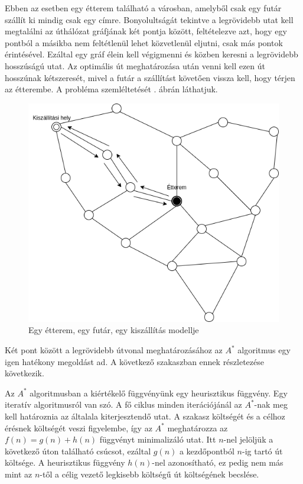

Ebben az esetben egy étterem található a városban, amelyből csak egy futár szállít ki mindig csak egy címre.
Bonyolultságát tekintve a legrövidebb utat kell megtalálni az úthálózat gráfjának két pontja között, feltételezve azt, hogy egy pontból a másikba nem feltétlenül lehet közvetlenül eljutni, csak más pontok érintésével. Ezáltal egy gráf élein kell végigmenni és közben keresni a legrövidebb hosszúságú utat. Az optimális út meghatározása után venni kell ezen út hosszúnak kétszeresét, mivel a futár a szállítást követően vissza kell, hogy térjen az étterembe.
A probléma szemléltetését . ábrán láthatjuk.

\begin{figure}[h!]
\centering
\includegraphics[scale=0.5]{images/Astar.png}
\caption{Egy étterem, egy futár, egy kiszállítás modellje}
\label{fig:model1}
\end{figure}

Két pont között a legrövidebb útvonal meghatározásához az $A^{*}$ algoritmus egy igen hatékony megoldást ad.
A következő szakaszban ennek részletezése következik.


Az $A^{*}$ algoritmusban a kiértékelő függvényünk egy heurisztikus függvény.
Egy iteratív algoritmusról van szó.
A fő ciklus minden iterációjánál az $A^{*}$-nak meg kell határoznia az általala kiterjesztendő utat.
A szakasz költségét és a célhoz érésnek költségét veszi figyelembe, így az $A^{*}$ meghatározza az $f(n) = g(n) + h(n)$ függvényt minimalizáló utat. Itt $n$-nel jelöljük a következő úton található csúcsot, ezáltal $g(n)$ a kezdőpontból $n$-ig tartó út költsége. A heurisztikus függvény $h(n)$-nel azonosítható, ez pedig nem más mint az $n$-től a célig vezető legkisebb költségű út költségének becslése.

